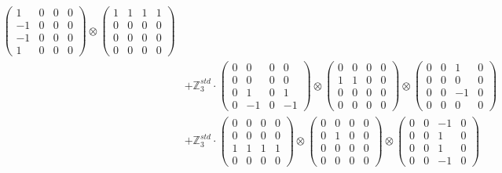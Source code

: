 \documentclass{article}
\begin{document}
{\begin{align}
            \begin{pmatrix} 1 & 0 & 0 & 0 \\ -1 & 0 & 0 & 0 \\ -1 & 0 & 0 & 0 \\ 1 & 0 & 0 & 0 \end{pmatrix} \otimes 
            \begin{pmatrix} 1 & 1 & 1 & 1 \\ 0 & 0 & 0 & 0 \\ 0 & 0 & 0 & 0 \\ 0 & 0 & 0 & 0 \end{pmatrix} \\ 
        &+ \label{Rs1-Rc16-Strassen-1-c10} \mathbb{Z}_3^{std} \cdot 
            \begin{pmatrix} 0 & 0 & 0 & 0 \\ 0 & 0 & 0 & 0 \\ 0 & 1 & 0 & 1 \\ 0 & -1 & 0 & -1 \end{pmatrix} \otimes 
            \begin{pmatrix} 0 & 0 & 0 & 0 \\ 1 & 1 & 0 & 0 \\ 0 & 0 & 0 & 0 \\ 0 & 0 & 0 & 0 \end{pmatrix} \otimes 
            \begin{pmatrix} 0 & 0 & 1 & 0 \\ 0 & 0 & 0 & 0 \\ 0 & 0 & -1 & 0 \\ 0 & 0 & 0 & 0 \end{pmatrix} \\ 
        &+ \label{Rs1-Rc16-Strassen-1-c11} \mathbb{Z}_3^{std} \cdot 
            \begin{pmatrix} 0 & 0 & 0 & 0 \\ 0 & 0 & 0 & 0 \\ 1 & 1 & 1 & 1 \\ 0 & 0 & 0 & 0 \end{pmatrix} \otimes 
            \begin{pmatrix} 0 & 0 & 0 & 0 \\ 0 & 1 & 0 & 0 \\ 0 & 0 & 0 & 0 \\ 0 & 0 & 0 & 0 \end{pmatrix} \otimes 
            \begin{pmatrix} 0 & 0 & -1 & 0 \\ 0 & 0 & 1 & 0 \\ 0 & 0 & 1 & 0 \\ 0 & 0 & -1 & 0 \end{pmatrix} \\ 

\end{align}}
\end{document}
